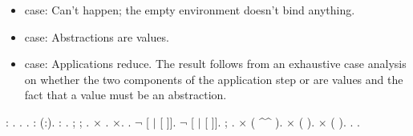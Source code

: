 \documentclass[12pt]{report}
\begin{document}
\begin{itemize}
\item  {} case: Can't happen; the empty environment
        doesn't bind anything.



\item  {} case: Abstractions are values.



\item  {} case: Applications reduce.  The result follows
        from an exhaustive case analysis on whether the two components
        of the application step or are values and the fact that a
        value must be an abstraction. 

\end{itemize}
\begin{coqdoccode}
\coqdocemptyline
\coqdocnoindent
{}  : .\coqdoceol
\coqdocnoindent
{}.\coqdoceol
\coqdocindent{1.00em}
 .  : (:).  : .\coqdoceol
\coqdocindent{1.00em}
 ; ; .\coqdoceol
\coqdocindent{1.00em}
\ensuremath{\times} .\coqdoceol
\coqdocindent{1.00em}
\ensuremath{\times}.\coqdoceol
\coqdocindent{1.00em}
. \ensuremath{\lnot}   [ \ensuremath{|} [ ]].\coqdoceol
\coqdocindent{2.00em}
\ensuremath{\lnot}   [ \ensuremath{|} [ ]].\coqdoceol
\coqdocindent{3.00em}
 ;  . \coqdoctac{\ensuremath{\exists}}\ensuremath{\times} ( \^{}\^{} ).\coqdoceol
\coqdocindent{3.00em}
\coqdoctac{\ensuremath{\exists}}\ensuremath{\times} (  ).\coqdoceol
\coqdocindent{2.00em}
\coqdoctac{\ensuremath{\exists}}\ensuremath{\times} (  ).\coqdoceol
\coqdocnoindent
{}.\coqdoceol
\coqdocemptyline
\coqdocnoindent
{} .\coqdoceol
\coqdocemptyline
\end{coqdoccode}
\end{document}
